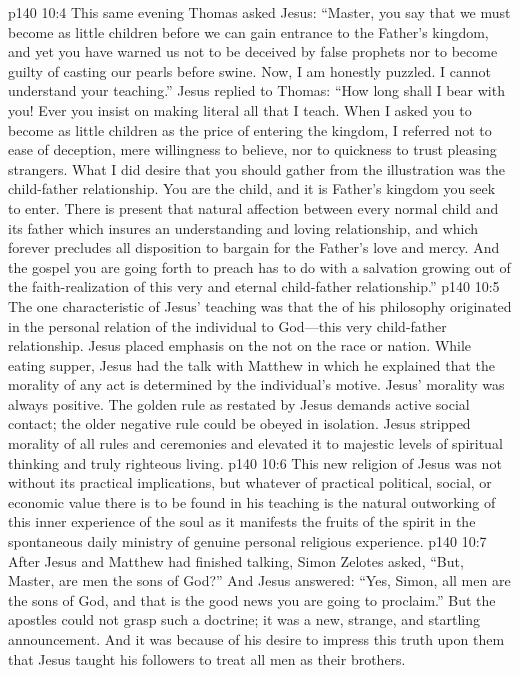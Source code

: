 \pc \vs p140 10:4 This same evening Thomas asked Jesus: “Master, you say that we must become as little children before we can gain entrance to the Father’s kingdom, and yet you have warned us not to be deceived by false prophets nor to become guilty of casting our pearls before swine. Now, I am honestly puzzled. I cannot understand your teaching.” Jesus replied to Thomas: \textcolor{ubdarkred}{“How long shall I bear with you! Ever you insist on making literal all that I teach. When I asked you to become as little children as the price of entering the kingdom, I referred not to ease of deception, mere willingness to believe, nor to quickness to trust pleasing strangers. What I did desire that you should gather from the illustration was the child\hyp{}father relationship. You are the child, and it is  Father’s kingdom you seek to enter. There is present that natural affection between every normal child and its father which insures an understanding and loving relationship, and which forever precludes all disposition to bargain for the Father’s love and mercy. And the gospel you are going forth to preach has to do with a salvation growing out of the faith\hyp{}realization of this very and eternal child\hyp{}father relationship.”}
\pc \vs p140 10:5 The one characteristic of Jesus’ teaching was that the  of his philosophy originated in the personal relation of the individual to God---this very child\hyp{}father relationship. Jesus placed emphasis on the  not on the race or nation. While eating supper, Jesus had the talk with Matthew in which he explained that the morality of any act is determined by the individual’s motive. Jesus’ morality was always positive. The golden rule as restated by Jesus demands active social contact; the older negative rule could be obeyed in isolation. Jesus stripped morality of all rules and ceremonies and elevated it to majestic levels of spiritual thinking and truly righteous living.
\vs p140 10:6 This new religion of Jesus was not without its practical implications, but whatever of practical political, social, or economic value there is to be found in his teaching is the natural outworking of this inner experience of the soul as it manifests the fruits of the spirit in the spontaneous daily ministry of genuine personal religious experience.
\vs p140 10:7 After Jesus and Matthew had finished talking, Simon Zelotes asked, “But, Master, are  men the sons of God?” And Jesus answered: \textcolor{ubdarkred}{“Yes, Simon, all men are the sons of God, and that is the good news you are going to proclaim.”} But the apostles could not grasp such a doctrine; it was a new, strange, and startling announcement. And it was because of his desire to impress this truth upon them that Jesus taught his followers to treat all men as their brothers.
